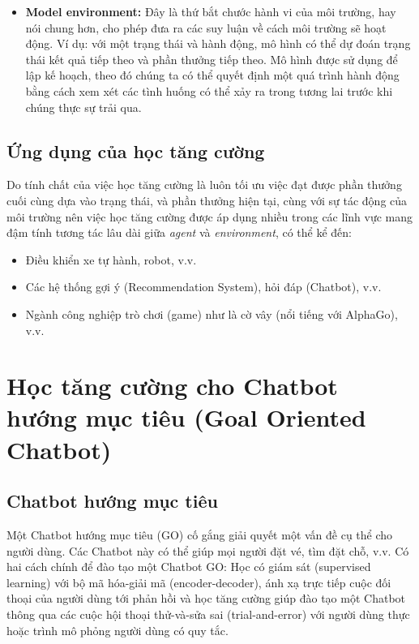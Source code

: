 \begin{itemize}
    \item \textbf{Model environment:} Đây là thứ bắt chước hành vi của môi trường, hay nói chung hơn, cho phép đưa ra các suy luận về cách môi trường sẽ hoạt động. Ví dụ: với một trạng thái và hành động, mô hình có thể dự đoán trạng thái kết quả tiếp theo và phần thưởng tiếp theo. Mô hình được sử dụng để lập kế hoạch, theo đó chúng ta có thể quyết định một quá trình hành động bằng cách xem xét các tình huống có thể xảy ra trong tương lai trước khi chúng thực sự trải qua.
\end{itemize}

\subsection{Ứng dụng của học tăng cường}
Do tính chất của việc học tăng cường là luôn tối ưu việc đạt được phần thưởng cuối cùng dựa vào trạng thái, và phần thưởng hiện tại, cùng với sự tác động của môi trường nên việc học tăng cường được áp dụng nhiều trong các lĩnh vực mang đậm tính tương tác lâu dài giữa \textit{agent} và \textit{environment}, có thể kể đến:

\begin{itemize}
    \item Điều khiển xe tự hành, robot, v.v.
    \item Các hệ thống gợi ý (Recommendation System), hỏi đáp (Chatbot), v.v.
    \item Ngành công nghiệp trò chơi (game) như là cờ vây (nổi tiếng với AlphaGo), v.v.
\end{itemize}

\section{Học tăng cường cho Chatbot hướng mục tiêu (Goal Oriented Chatbot)}

\subsection{Chatbot hướng mục tiêu}
\label{subsec:chatbotgo}
Một Chatbot hướng mục tiêu (GO) \cite{traininggochatbot} cố gắng giải quyết một vấn đề cụ thể cho người dùng. Các Chatbot này có thể giúp mọi người đặt vé, tìm đặt chỗ, v.v. Có hai cách chính để đào tạo một Chatbot GO: Học có giám sát (supervised learning) với bộ mã hóa-giải mã (encoder-decoder), ánh xạ trực tiếp cuộc đối thoại của người dùng tới phản hồi và học tăng cường giúp đào tạo một Chatbot thông qua các cuộc hội thoại thử-và-sửa sai (trial-and-error) với người dùng thực hoặc trình mô phỏng người dùng có quy tắc.

